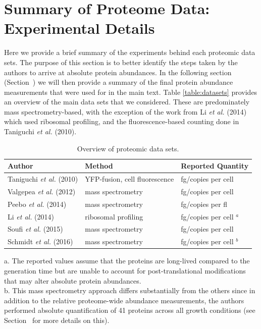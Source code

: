 \section{Summary of Proteome Data: Experimental Details}
\label{sec:SI_exp_summary}

Here we provide a brief summary of the experiments behind each proteomic data
sets. The purpose of this section is to better identify the steps taken by the
authors to arrive at absolute protein abundances. In the following section
(Section~) we will then provide a summary of the
final protein abundance measurements that were used for in the main text. Table
\ref{table:datasets} provides an overview of the main data sets that we
considered. These are predominately mass spectrometry-based, with the exception
of the work from Li \textit{et al.} (2014) which used ribosomal profiling, and
the fluorescence-based counting done in Taniguchi \textit{et al.} (2010).

\begin{table}[bt]
\caption{\label{tab:datasets}Overview of proteomic data sets.}
\begin{tabular}{l l l }
\toprule
Author & Method & Reported Quantity \\
\midrule
Taniguchi \textit{et al.} (2010)  & YFP-fusion, cell fluorescence    & fg/copies per cell      \\
Valgepea \textit{et al.} (2012)   & mass spectrometry                & fg/copies per cell      \\
Peebo \textit{et al.} (2014)      & mass spectrometry                & fg/copies per fl        \\
Li \textit{et al.} (2014)         & ribosomal profiling              & fg/copies per cell $^a$ \\
Soufi \textit{et al.} (2015)      & mass spectrometry                & fg/copies per cell      \\
Schmidt \textit{et al.} (2016)    & mass spectrometry                & fg/copies per cell $^b$ \\
\bottomrule
\end{tabular}

\medskip
a. The reported values assume that the proteins are long-lived compared to the
generation time but are unable to account for post-translational modifications
that may alter absolute protein abundances.
\\
b. This mass spectrometry approach differs substantially from the others since
in addition to the relative proteome-wide abundance measurements, the authors
performed absolute quantification of 41 proteins across all growth conditions
(see Section~ for more details on this).
\end{table}

